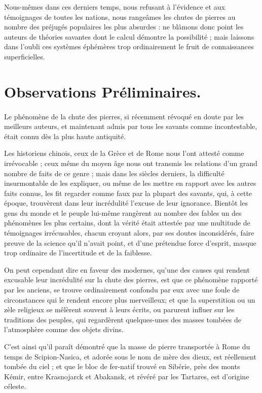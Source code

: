\documentclass[a4paper, 12pt, oneside, french]{article}
\begin{document}
Nous-mêmes dans ces derniers temps, nous refusant à l'évidence et aux témoignages de toutes les nations, nous rangeâmes les chutes de pierres au nombre des préjugés populaires les plus absurdes : ne blâmons donc point les auteurs de théories savantes dont le calcul démontre la possibilité ; mais laissons dans l'oubli ces systèmes éphémères trop ordinairement le fruit de connaissances superficielles.
\clearpage
\section*{Observations Préliminaires.}
\paragraph{}
Le phénomène de la chute des pierres, si récemment révoqué en doute par les meilleurs auteurs, et maintenant admis par tous les savants comme incontestable, était connu dès la plus haute antiquité.

Les historiens chinois, ceux de la Grèce et de Rome nous l'ont attesté comme irrévocable ; ceux même du moyen âge nous ont transmis les relations d'un grand nombre de faits de ce genre ; mais dans les siècles derniers, la difficulté insurmontable de les expliquer, ou même de les mettre en rapport avec les autres faits connus, les fit regarder comme faux par la plupart des savants, qui, à cette époque, trouvèrent dans leur incrédulité l'excuse de leur ignorance. Bientôt les gens du monde et le peuple lui-même rangèrent au nombre des fables un des phénomènes les plus certains, dont la vérité était attestée par une multitude de témoignages irrécusables, chacun croyant alors, par ses doutes inconsidérés, faire preuve de la science qu'il n'avait point, et d'une prétendue force d'esprit, masque trop ordinaire de l'incertitude et de la faiblesse.

On peut cependant dire en faveur des modernes, qu'une des causes qui rendent excusable leur incrédulité sur la chute des pierres, est que ce phénomène rapporté par les anciens, se trouve ordinairement confondu par eux avec une foule de circonstances qui le rendent encore plus merveilleux; et que la superstition ou un zèle religieux se mêlèrent souvent à leurs écrits, ou parurent influer sur les traditions des peuples, qui regardèrent quelques-unes des masses tombées de l'atmosphère comme des objets divins.

C'est ainsi qu'il paraît démontré que la masse de pierre transportée à Rome du temps de Scipion-Nasica, et adorée sous le nom de mère des dieux, est réellement tombée du ciel ; et que le bloc de fer-natif trouvé en Sibérie, près des monts Kémir, entre Krasnojarck et Abakansk, et révéré par les Tartares, est d'origine céleste.
\end{document}
